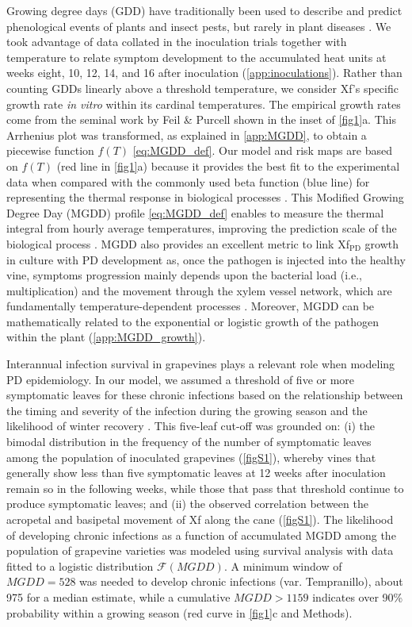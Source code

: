 Growing degree days (GDD) have traditionally been used to describe and predict
phenological events of plants and insect pests, but rarely in plant diseases
\cite{McMaster1997}. We took advantage of data collated in the inoculation
trials together with temperature to relate symptom development to the
accumulated heat units at weeks eight, 10, 12, 14, and 16 after inoculation
(\cref{app:inoculations}).  Rather than counting GDDs linearly above a
threshold temperature, we consider Xf's specific growth rate \textit{in vitro}
within its cardinal temperatures. The empirical growth rates come from the
seminal work by Feil \& Purcell \cite{Feil2001} shown in the inset of
\cref{fig1}a. This Arrhenius plot was transformed, as explained in
\cref{app:MGDD}, to obtain a piecewise function $f(T)$
\cref{eq:MGDD_def}. Our model and risk maps are based on $f(T)$ (red line in
\cref{fig1}a) because it provides the best fit to the experimental data when
compared with the commonly used beta function (blue line) for representing the
thermal response in biological processes \cite{Yan1999,Magarey2005}. This
Modified Growing Degree Day (MGDD) profile \cref{eq:MGDD_def} enables to
measure the thermal integral from hourly average temperatures, improving the
prediction scale of the biological process \cite{butikofer2020problem}. MGDD
also provides an excellent metric to link Xf$_{\textrm{PD}}$ growth in culture
with PD development as, once the pathogen is injected into the healthy vine,
symptoms progression mainly depends upon the bacterial load (i.e.,
multiplication) and the movement through the xylem vessel network, which are
fundamentally temperature-dependent processes
\cite{fry1990multiplication,Feil2001}. Moreover, MGDD can be mathematically
related to the exponential or logistic growth of the pathogen within the plant
(\cref{app:MGDD_growth}).

Interannual infection survival in grapevines plays a relevant role when
modeling PD epidemiology. In our model, we assumed a threshold of five or more
symptomatic leaves for these chronic infections based on the relationship
between the timing and severity of the infection during the growing season and
the likelihood of winter recovery  \cite{Feil2001, Feil2003, Lieth2011}. This
five-leaf cut-off was grounded on: (i) the bimodal distribution in the
frequency of the number of symptomatic leaves among the population of
inoculated grapevines (\cref{figS1}), whereby vines that generally
show less than five symptomatic leaves at 12 weeks after inoculation remain so
in the following weeks, while those that pass that threshold continue to
produce symptomatic leaves; and (ii) the observed correlation between the
acropetal and basipetal movement of Xf along the cane (\cref{figS1}).
The likelihood of developing chronic infections as a function of accumulated
MGDD among the population of grapevine varieties was modeled using survival
analysis with data fitted to a logistic distribution $\mathcal{F}(MGDD)$. A
minimum window of $MGDD=528$ was needed to develop chronic infections (var.
Tempranillo), about 975 for a median estimate, while a cumulative $MGDD>1159$
indicates over 90\% probability within a growing season (red curve in
\cref{fig1}c and Methods).

